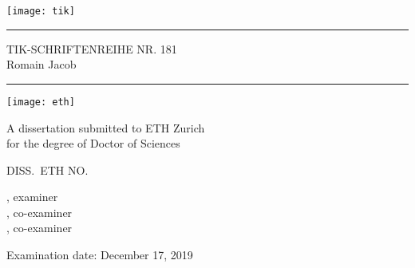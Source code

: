 
\thispagestyle{empty}
\noindent\texttt{[image: tik]}
\medskip
\hrule
\begin{flushright}
\vspace{0.5cm}
TIK-SCHRIFTENREIHE NR. 181
\\ \vspace{1cm}
\large Romain Jacob \\ \vspace{1cm}
\end{flushright}
\begin{flushright}
\Large\bfseries
\titlestring
\end{flushright}
\vspace{\fill}
\hrule
\bigskip
\texttt{[image: eth]}


\clearpage
\thispagestyle{empty}


\noindent
A dissertation submitted to ETH Zurich\\
for the degree of Doctor of Sciences

\noindent DISS.\ ETH NO.\ \dissnumstring

\noindent \examinerstring, examiner\\
\coexaminerstringA, co-examiner\\
\coexaminerstringB, co-examiner

\noindent Examination date: December 17, 2019\\
\vfill
\noindent
